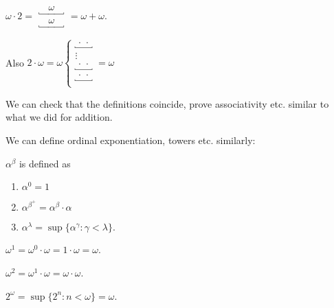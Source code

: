 \documentclass[a4paper]{article}
\begin{document}
\begin{eg}
  $\displaystyle\omega\cdot 2 =
  \begin{array}{c}
    \underbracket{\quad\omega\quad}\\
    \underbracket{\quad\omega\quad}
  \end{array} = \omega + \omega$.

  Also $2\cdot \omega = \omega\left\{
  \begin{array}{c}
    \underbracket{\,\cdot\,\cdot\,} \\
    \vdots \\
    \underbracket{\,\cdot\,\cdot\,} \\
    \underbracket{\,\cdot\,\cdot\,} \\
  \end{array}\right. = \omega$
\end{eg}
We can check that the definitions coincide, prove associativity etc. similar to what we did for addition.

We can define ordinal exponentiation, towers etc. similarly:
\begin{defi}
  $\alpha^\beta$ is defined as
  \begin{enumerate}
    \item $\alpha^0 = 1$
    \item $\alpha^{\beta^+} = \alpha^\beta \cdot \alpha$
    \item $\alpha^{\lambda} = \sup \{\alpha^\gamma: \gamma< \lambda\}$.
  \end{enumerate}
\end{defi}

\begin{eg}
  $\omega^1 = \omega^0\cdot \omega = 1\cdot \omega = \omega$.

  $\omega^2 = \omega^1\cdot \omega = \omega\cdot \omega$.

  $2^{\omega} = \sup \{2^n: n < \omega\} = \omega$.
\end{eg}
\end{document}
